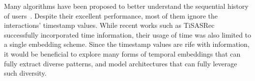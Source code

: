 

Many algorithms have been proposed to better understand the sequential history of users~\cite{SASRec, BERT4Rec, hidasi2018recurrent, CASER, M3, rendle2010factorizing, DIN, TRANSREC}. Despite their excellent performance, most of them ignore the interactions' timestamp values. While recent works such as TiSASRec~\cite{TISASRec} successfully incorporated time information, their usage of time was also limited to a single embedding scheme. Since the timestamp values are rife with information, it would be beneficial to explore many forms of temporal embeddings that can fully extract diverse patterns, and model architectures that can fully leverage such diversity.




